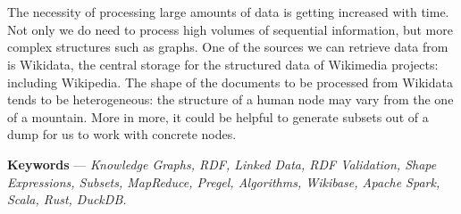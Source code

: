 \newenvironment{abstract}%
{\cleardoublepage\null\vfill\section*{\abstractname}}%
{\vfill\null}
\begin{abstract}
    The necessity of processing large amounts of data is getting increased with time. Not only we do need to process high volumes of sequential information, but more complex structures such as graphs. One of the sources we can retrieve data from is Wikidata, the central storage for the structured data of Wikimedia projects: including Wikipedia. The shape of the documents to be processed from Wikidata tends to be heterogeneous: the structure of a human node may vary from the one of a mountain. More in more, it could be helpful to generate subsets out of a dump for us to work with concrete nodes.
\end{abstract}

\noindent \textbf{Keywords} --- \textit{Knowledge Graphs, RDF, Linked Data, RDF Validation, Shape Expressions, Subsets, MapReduce, Pregel, Algorithms, Wikibase, Apache Spark, Scala, Rust, DuckDB.}
